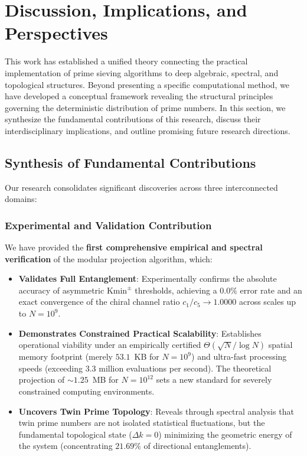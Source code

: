 \documentclass{article}
\numberwithin{equation}{section}
\theoremstyle{plain}
\theoremstyle{definition}
\begin{document}

\section{Discussion, Implications, and Perspectives}
\label{sec:discusion-conclusiones}

This work has established a unified theory connecting the practical implementation of prime sieving algorithms to deep algebraic, spectral, and topological structures. Beyond presenting a specific computational method, we have developed a conceptual framework revealing the structural principles governing the deterministic distribution of prime numbers. In this section, we synthesize the fundamental contributions of this research, discuss their interdisciplinary implications, and outline promising future research directions.

\subsection{Synthesis of Fundamental Contributions}

Our research consolidates significant discoveries across three interconnected domains:

\subsubsection{Experimental and Validation Contribution}

We have provided the \textbf{first comprehensive empirical and spectral verification} of the modular projection algorithm, which:

\begin{itemize}
    \item \textbf{Validates Full Entanglement}: Experimentally confirms the absolute accuracy of asymmetric $\mathrm{Kmin}^\pm$ thresholds, achieving a $0.0\%$ error rate and an exact convergence of the chiral channel ratio $c_1/c_5 \to 1.0000$ across scales up to $N=10^9$.
    \item \textbf{Demonstrates Constrained Practical Scalability}: Establishes operational viability under an empirically certified $\Theta(\sqrt{N}/\log N)$ spatial memory footprint (merely $53.1$~KB for $N=10^9$) and ultra-fast processing speeds (exceeding $3.3$ million evaluations per second). The theoretical projection of $\sim 1.25$~MB for $N=10^{12}$ sets a new standard for severely constrained computing environments.
    \item \textbf{Uncovers Twin Prime Topology}: Reveals through spectral analysis that twin prime numbers are not isolated statistical fluctuations, but the fundamental topological state ($\Delta k = 0$) minimizing the geometric energy of the system (concentrating $21.69\%$ of directional entanglements).
\end{itemize}
\end{document}
